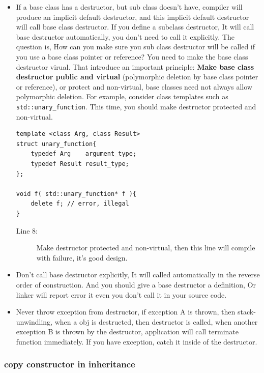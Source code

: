 \documentclass[a4paper,11pt,twoside]{book}
\begin{document}
\begin{itemize}
	\item If a base class has a destructor, but sub class doesn't have,  compiler will produce an implicit default destructor, and this implicit default destructor will call base class destructor. If you define a subclass destructor, It will call base destructor automatically, you don't need to call it explicitly. The question is, How can you make sure you sub class destructor will be called if you use a base class pointer or reference? You need to make the base class destructor virual. That introduce an important principle: \textbf{Make base class destructor public and virtual} (polymorphic deletion by base class pointer or reference), or protect and non-virtual, base classes need not always allow polymorphic deletion. For example, consider class templates such as \texttt{std::unary\_function}. This time, you should make destructor protected and non-virtual.
\begin{lstlisting}[]
template <class Arg, class Result>
struct unary_function{
	typedef Arg    argument_type;
	typedef Result result_type;
};
	
void f( std::unary_function* f ){
	delete f; // error, illegal
}
\end{lstlisting}
\begin{description}
	\item[Line 8:] Make destructor protected and non-virtual, then this line will compile with failure, it's good design. 
\end{description}

	\item Don't call base destructor explicitly, It will called automatically in the reverse order of construction.  And you should give a base destructor a definition, Or linker will report error it even you don't call it in your source code.
	
	\item Never throw exception from destructor, if exception A is thrown, then stack-unwindling, when a obj is destructed, then destructor is called, when another exception B is thrown by the destructor, application will call terminate function immediately.  If you have exception, catch it inside of the destructor.
	
\end{itemize}

\subsubsection{copy constructor in inheritance}
\end{document}
